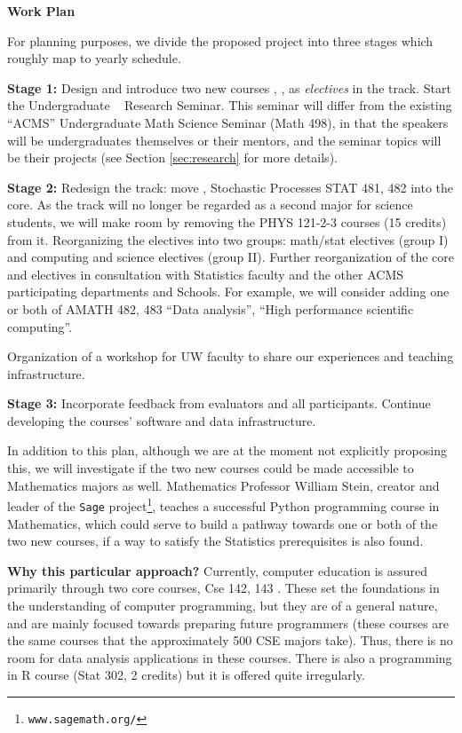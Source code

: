\vskip 0.1in
{\bf Work Plan}

For planning purposes, we divide the proposed project into three stages which
roughly map to yearly schedule. 

{\bf Stage 1:} Design and introduce two new courses \statcl, \astrocl,
as {\em electives} in the track.  Start the Undergraduate \cdse~
Research Seminar. This seminar will differ from the existing ``ACMS''
Undergraduate Math Science Seminar ({\sc Math 498}), in that the
speakers will be undergraduates themselves or their mentors, and the
seminar topics will be their projects (see Section
\ref{sec:research} for more details).

{\bf Stage 2:} Redesign the track: move \statcl, Stochastic Processes {\sc STAT 481, 482} into the core. As the track will no longer be regarded as a second major for science students, we will make room by removing the {\sc PHYS 121-2-3} courses (15 credits) from it.  Reorganizing the electives into two groups: math/stat electives (group I) and computing and science electives (group II). Further reorganization of the core and electives in consultation with Statistics faculty and the other ACMS participating departments and Schools. For example, we will consider adding one or both of {\sc AMATH 482, 483} ``Data analysis'', ``High performance scientific computing''.

Organization of a workshop for UW faculty to share our experiences and teaching infrastructure.

{\bf Stage 3:} Incorporate feedback from evaluators and all participants. Continue developing the courses' software and data infrastructure. 

In addition to this plan, although we are at the moment not explicitly
proposing this, we will investigate if the two new courses could be
made accessible to Mathematics majors as well. Mathematics Professor
William Stein, creator and leader of the {\tt Sage}
project\footnote{{\tt www.sagemath.org/}}, teaches a successful Python
programming course in Mathematics, which could serve to build a
pathway towards one or both of the two new courses, if a way to
satisfy the Statistics prerequisites is also found.


{\bf Why this particular approach?} Currently, computer education is
assured primarily through two core courses, {\sc Cse 142, 143}
\cite{cse142,Reges:java}. These set the foundations in the understanding of
computer programming, but they are of a general nature, and are mainly
focused towards preparing future programmers  (these courses are the
same courses that the approximately 500 CSE majors take). Thus, there
is no room for data analysis applications in these courses.  There is
also a programming in R course ({\sc Stat 302}, 2 credits) but it is 
offered quite irregularly.

